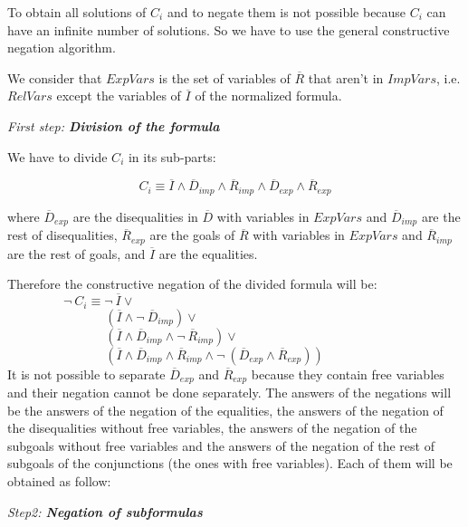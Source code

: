 \documentclass{llncs}
\begin{document}
To obtain all solutions of $C_i$ and to negate them is not possible
because $C_i$ can have an infinite number of solutions. So we have to
use the general constructive negation algorithm.  

We consider that $ExpVars$ is the set of variables of $\overline{R}$
that aren't in $ImpVars$, i.e. $RelVars$ except the variables of
$\overline{I}$ of the normalized formula.
\medskip

\noindent
{\em First step: {\bf Division of the formula}}

\noindent
We have to divide $C_i$ in its sub-parts:

\[C_i \equiv \overline{I} \wedge
        \overline{D}_{imp} \wedge \overline{R}_{imp} \wedge
        \overline{D}_{exp} \wedge \overline{R}_{exp} \]

\noindent
where $\overline{D}_{exp}$ are the disequalities in $\overline{D}$
with variables in $ExpVars$ and $\overline{D}_{imp}$ are the rest of
disequalities, $\overline{R}_{exp}$ are the goals of $\overline{R}$
with variables in $ExpVars$ and $\overline{R}_{imp}$ are the rest of
goals, and $\overline{I}$ are the equalities.

Therefore the constructive negation of the divided formula will be: \\

$~~~~~~~~~~~~~~~~~~~~\neg~C_i \equiv \neg~\overline{I} \vee $ \\
$~~~~~~~~~~~~~~~~~~~~~~~~~~~~~~~~~~~(\overline{I} \wedge \neg~\overline{D}_{imp}) \vee  $ \\
$~~~~~~~~~~~~~~~~~~~~~~~~~~~~~~~~~~~(\overline{I} \wedge \overline{D}_{imp} \wedge  \neg~\overline{R}_{imp}) \vee $ \\
$~~~~~~~~~~~~~~~~~~~~~~~~~~~~~~~~~~~( \overline{I} \wedge \overline{D}_{imp} \wedge \overline{R}_{imp} \wedge \neg~(\overline{D}_{exp} \wedge \overline{R}_{exp})) $ \\

It is not possible to separate $\overline{D}_{exp}$ and
$\overline{R}_{exp}$ because they contain free variables and
their negation cannot be done separately. The answers of the negations
will be the answers of the negation of the equalities, the answers of
the negation of the disequalities without free variables, the answers
of the negation of the subgoals without free variables and the answers
of the negation of the rest of subgoals of the conjunctions (the ones
with free variables). Each of them will be obtained as follow:
\medskip

\noindent
{\em Step2: {\bf Negation of subformulas}}
\end{document}
